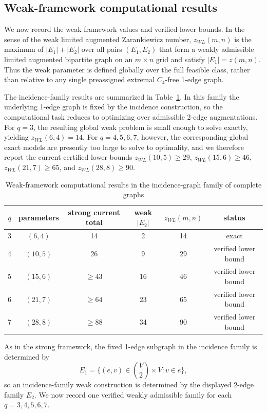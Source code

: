 \documentclass[10pt]{article}
\newcommand{\blue}[1]{#1}
\newcommand{\0}{\mathbf{0}}
\newcommand{\1}{\mathbf{1}}
\begin{document}
\subsection*{Weak-framework computational results}

\blue{We now record the weak-framework values and verified lower bounds. In the sense of the weak limited augmented Zarankiewicz number, \(z_{WL}(m,n)\) is the maximum of \(|E_1|+|E_2|\) over all pairs \((E_1,E_2)\) that form a weakly admissible limited augmented bipartite graph on an \(m\times n\) grid and satisfy \(|E_1|=z(m,n)\). Thus the weak parameter is defined globally over the full feasible class, rather than relative to any single preassigned extremal \(C_4\)-free 1-edge graph.}

\blue{The incidence-family results are summarized in Table~\ref{tab:w3-incidence}. In this family the underlying 1-edge graph is fixed by the incidence construction, so the computational task reduces to optimizing over admissible 2-edge augmentations. For \(q=3\), the resulting global weak problem is small enough to solve exactly, yielding \(z_{WL}(6,4)=14\). For \(q=4,5,6,7\), however, the corresponding global exact models are presently too large to solve to optimality, and we therefore report the current certified lower bounds \(z_{WL}(10,5)\ge 29\), \(z_{WL}(15,6)\ge 46\), \(z_{WL}(21,7)\ge 65\), and \(z_{WL}(28,8)\ge 90\).}

\begin{table}[htbp]
\centering
\caption{\blue{Weak-framework computational results in the incidence-graph family of complete graphs}}
\label{tab:w3-incidence}
\begin{tabular}{|c|c|c|c|c|c|}
\hline
\(q\) & parameters & strong current total & weak \(|E_2|\) & \(z_{WL}(m,n)\) & status \\ \hline
3 & \((6,4)\) & 14 & 2 & 14 & exact \\
4 & \((10,5)\) & 26 & 9 & 29 & verified lower bound \\
5 & \((15,6)\) & \(\ge 43\) & 16 & 46 & verified lower bound \\
6 & \((21,7)\) & \(\ge 64\) & 23 & 65 & verified lower bound \\
7 & \((28,8)\) & \(\ge 88\) & 34 & 90 & verified lower bound \\ \hline
\end{tabular}
\end{table}

\blue{As in the strong framework, the fixed 1-edge subgraph in the incidence family is determined by}
\[
\blue{E_1=\{(e,v)\in \binom{V}{2}\times V: v\in e\},}
\]
\blue{so an incidence-family weak construction is determined by the displayed 2-edge family \(E_2\). We now record one verified weakly admissible family for each \(q=3,4,5,6,7\).}
\end{document}
